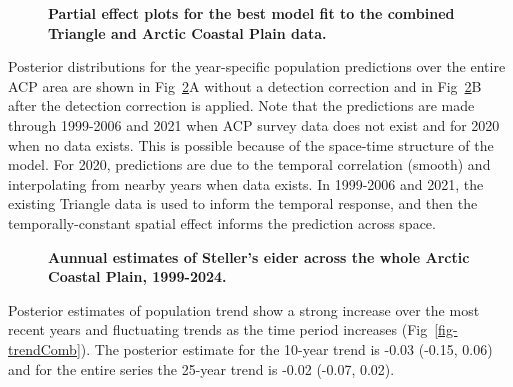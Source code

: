 \documentclass[
  10pt,
  letterpaper,
]{article}
\begin{document}
\begin{figure}

\caption{\label{fig-mapComb}\textbf{Partial effect plots for the best model fit to the combined Triangle and Arctic Coastal Plain data.} }

\end{figure}%

Posterior distributions for the year-specific population predictions
over the entire ACP area are shown in Fig~\ref{fig-yearComb}A without a
detection correction and in Fig~\ref{fig-yearComb}B after the detection
correction is applied. Note that the predictions are made through
1999-2006 and 2021 when ACP survey data does not exist and for 2020 when
no data exists. This is possible because of the space-time structure of
the model. For 2020, predictions are due to the temporal correlation
(smooth) and interpolating from nearby years when data exists. In
1999-2006 and 2021, the existing Triangle data is used to inform the
temporal response, and then the temporally-constant spatial effect
informs the prediction across space.

\begin{figure}

\caption{\label{fig-yearComb}\textbf{Aunnual estimates of Steller's eider across the whole Arctic Coastal Plain, 1999-2024.} }

\end{figure}%

Posterior estimates of population trend show a strong increase over the
most recent years and fluctuating trends as the time period increases
(Fig~\ref{fig-trendComb}). The posterior estimate for the 10-year trend
is -0.03 (-0.15, 0.06) and for the entire series the 25-year trend is
-0.02 (-0.07, 0.02).
\end{document}
